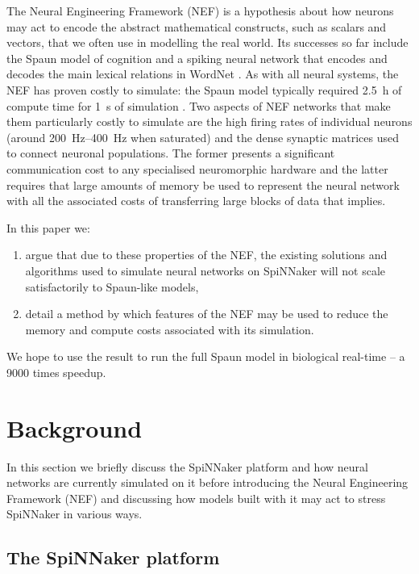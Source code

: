 \documentclass[conference]{IEEEtran}
\begin{document}
The Neural Engineering Framework (NEF) \parencite{Eliasmith2004} is a hypothesis about how neurons may act to encode the abstract mathematical constructs, such as scalars and vectors, that we often use in modelling the real world.
Its successes so far include the Spaun model of cognition \parencite{Eliasmith2012} and a spiking neural network that encodes and decodes the main lexical relations in WordNet \parencite{Crawford2013}.
As with all neural systems, the NEF has proven costly to simulate: the Spaun model typically required \SI{2.5}{\hour} of compute time for \SI{1}{\second} of simulation \parencite[\S V]{Stewart2014}.
Two aspects of NEF networks that make them particularly costly to simulate are the high firing rates of individual neurons (around \SIrange{200}{400}{\hertz} when saturated) and the dense synaptic matrices used to connect neuronal populations.
The former presents a significant communication cost to any specialised neuromorphic hardware and the latter requires that large amounts of memory be used to represent the neural network with all the associated costs of transferring large blocks of data that implies.

  In this paper we:
  \begin{enumerate}
    \item argue that due to these properties of the NEF, the existing solutions and algorithms used to simulate neural networks on SpiNNaker will not scale satisfactorily to Spaun-like models,
    \item detail a method by which features of the NEF may be used to reduce the memory and compute costs associated with its simulation.
  \end{enumerate}

We hope to use the result to run the full Spaun model in biological real-time -- a \num{9000} times speedup.

  \section{Background}

In this section we briefly discuss the SpiNNaker platform and how neural networks are currently simulated on it before introducing the Neural Engineering Framework (NEF) and discussing how models built with it may act to stress SpiNNaker in various ways.

  \subsection{The SpiNNaker platform}
\end{document}
